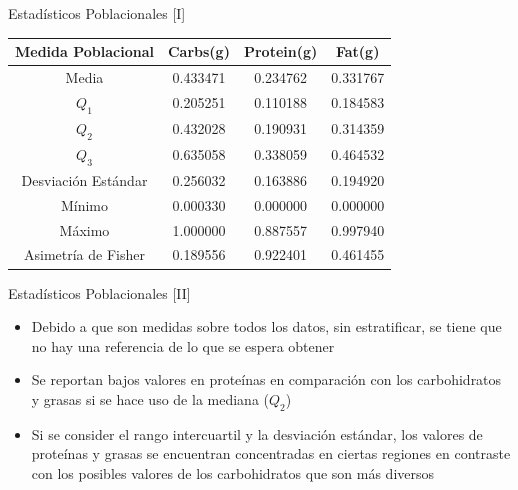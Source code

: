 \documentclass{beamer}
\begin{document}
    \begin{frame}{Estadísticos Poblacionales [I]}
        \begin{center}
            \begin{tabular}{|c|ccc|}
                \hline
                Medida Poblacional & Carbs(g) & Protein(g) & Fat(g) \\
                \hline
                Media               & 0.433471 & 0.234762 & 0.331767 \\
                $Q_1$               & 0.205251 & 0.110188 & 0.184583 \\
                $Q_2$               & 0.432028 & 0.190931 & 0.314359 \\
                $Q_3$               & 0.635058 & 0.338059 & 0.464532 \\
                Desviación Estándar & 0.256032 & 0.163886 & 0.194920 \\
                Mínimo              & 0.000330 & 0.000000 & 0.000000 \\
                Máximo              & 1.000000 & 0.887557 & 0.997940 \\
                Asimetría de Fisher & 0.189556 & 0.922401 & 0.461455 \\
                \hline
            \end{tabular}
        \end{center}
    \end{frame}

    \begin{frame}{Estadísticos Poblacionales [II]}
        \begin{itemize}
            \item<1->Debido a que son medidas sobre todos 
            los datos, sin estratificar, se tiene que no 
            hay una referencia de lo que se espera obtener
            \item<2->Se reportan bajos valores en proteínas 
            en comparación con los carbohidratos y grasas 
            si se hace uso de la mediana ($Q_2$)
            \item<3->Si se consider el rango intercuartil y 
            la desviación estándar, los valores de proteínas y 
            grasas se encuentran concentradas en ciertas regiones 
            en contraste con los posibles valores de los carbohidratos 
            que son más diversos
        \end{itemize}
    \end{frame}
\end{document}
